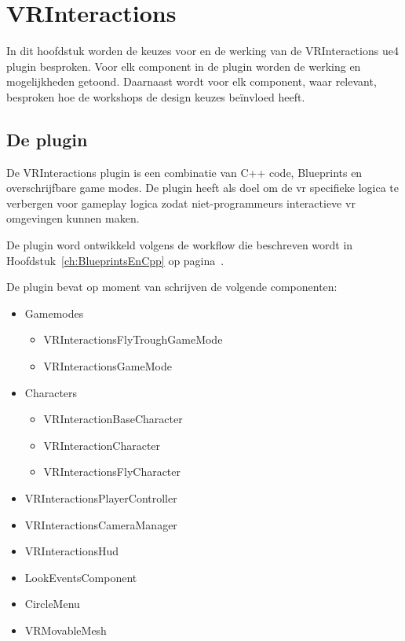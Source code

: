 \lstset {language=C++}

\chapter{VRInteractions}
\label{ch:vrinteractions}
In dit hoofdstuk worden de keuzes voor en de werking van de VRInteractions \gls{ue4} plugin besproken. 
Voor elk component in de plugin worden de werking en mogelijkheden getoond. Daarnaast wordt voor elk component, waar relevant, besproken hoe de workshops de design keuzes beïnvloed heeft.

\section{De plugin}
De VRInteractions plugin is een combinatie van C++ code, Blueprints en overschrijfbare game modes.
De plugin heeft als doel om de \gls{vr} specifieke logica te verbergen voor gameplay logica zodat niet-programmeurs interactieve \gls{vr} omgevingen kunnen maken.

De plugin word ontwikkeld volgens de workflow die beschreven wordt in Hoofdstuk~\ref{ch:BlueprintsEnCpp} op pagina~\pageref{ch:BlueprintsEnCpp}.

De plugin bevat op moment van schrijven de volgende componenten:
\begin{itemize}
	\item Gamemodes
		\begin{itemize}
			\item VRInteractionsFlyTroughGameMode
			\item VRInteractionsGameMode
		\end{itemize}
	\item Characters
		\begin{itemize}
			\item VRInteractionBaseCharacter
			\item VRInteractionCharacter
			\item VRInteractionsFlyCharacter
		\end{itemize}
	\item VRInteractionsPlayerController
	\item VRInteractionsCameraManager
	\item VRInteractionsHud
	\item LookEventsComponent
	\item CircleMenu
	\item VRMovableMesh
\end{itemize}

